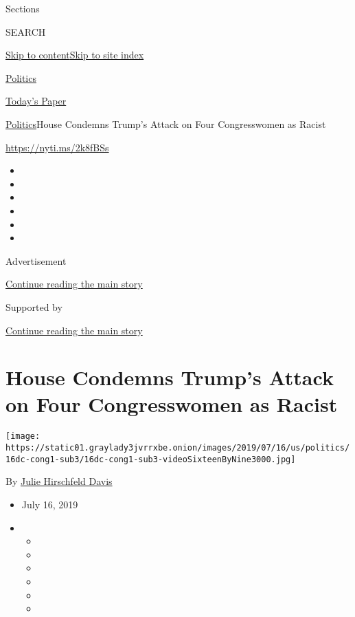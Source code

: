 Sections

SEARCH

\protect\hyperlink{site-content}{Skip to
content}\protect\hyperlink{site-index}{Skip to site index}

\href{https://www.nytimes3xbfgragh.onion/section/politics}{Politics}

\href{https://myaccount.nytimes3xbfgragh.onion/auth/login?response_type=cookie\&client_id=vi}{}

\href{https://www.nytimes3xbfgragh.onion/section/todayspaper}{Today's
Paper}

\href{/section/politics}{Politics}\textbar{}House Condemns Trump's
Attack on Four Congresswomen as Racist

\url{https://nyti.ms/2k8fBSs}

\begin{itemize}
\item
\item
\item
\item
\item
\item
\end{itemize}

Advertisement

\protect\hyperlink{after-top}{Continue reading the main story}

Supported by

\protect\hyperlink{after-sponsor}{Continue reading the main story}

\hypertarget{house-condemns-trumps-attack-on-four-congresswomen-as-racist}{%
\section{House Condemns Trump's Attack on Four Congresswomen as
Racist}\label{house-condemns-trumps-attack-on-four-congresswomen-as-racist}}

\texttt{[image: https://static01.graylady3jvrrxbe.onion/images/2019/07/16/us/politics/16dc-cong1-sub3/16dc-cong1-sub3-videoSixteenByNine3000.jpg]}

By
\href{https://www.nytimes3xbfgragh.onion/by/julie-hirschfeld-davis}{Julie
Hirschfeld Davis}

\begin{itemize}
\item
  July 16, 2019
\item
  \begin{itemize}
  \item
  \item
  \item
  \item
  \item
  \item
  \end{itemize}
\end{itemize}

